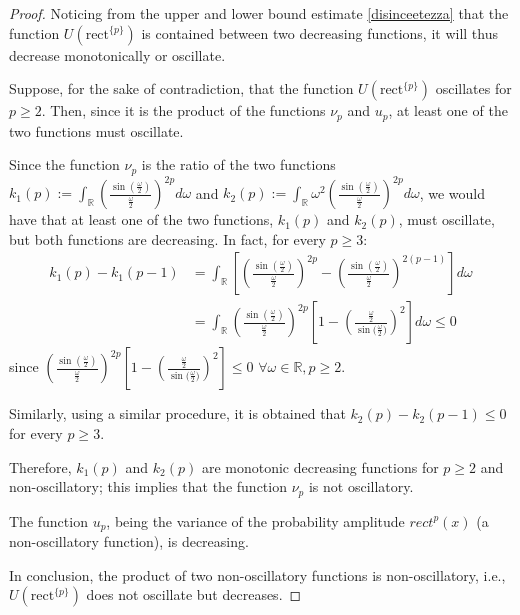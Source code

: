 \documentclass[preprint,hidelinks,authoryear]{elsarticle}
\theoremstyle{plain}
\theoremstyle{definition}
\theoremstyle{remark}
\begin{document}
\begin{proof}
    Noticing from the upper and lower bound estimate \eqref{disinceetezza} that the function $U(\text{rect}^{\{p\}})$ is contained between two decreasing functions, it will thus decrease monotonically or oscillate.

Suppose, for the sake of contradiction, that the function $U(\text{rect}^{\{p\}})$ oscillates for $p \ge 2$. Then, since it is the product of the functions $\nu_p$ and $u_p$, at least one of the two functions must oscillate.

Since the function $\nu_p$ is the ratio of the two functions $k_1(p):=\displaystyle\int_{\mathbb{R}}\left(\displaystyle\frac{\sin(\frac{\omega}{2})}{\frac{\omega}{2}}\right)^{2p}d\omega$ and $k_2(p):=\displaystyle\int_{\mathbb{R}}\omega^2\left(\displaystyle\frac{\sin(\frac{\omega}{2})}{\frac{\omega}{2}}\right)^{2p}d\omega$, we would have that at least one of the two functions, $k_1(p)$ and $k_2(p)$, must oscillate, but both functions are decreasing. In fact, for every $p \ge 3$:
\begin{equation}
\begin{split}
    k_1(p)-k_1(p-1)&=\displaystyle\int_{\mathbb{R}}\left[\left(\displaystyle\frac{\sin(\frac{\omega}{2})}{\frac{\omega}{2}}\right)^{2p}-\left(\displaystyle\frac{\sin(\frac{\omega}{2})}{\frac{\omega}{2}}\right)^{2(p-1)}\right]d\omega\\&=\displaystyle\int_{\mathbb{R}}\left(\displaystyle\frac{\sin(\frac{\omega}{2})}{\frac{\omega}{2}}\right)^{2p}\left[1-\left(\displaystyle\frac{\frac{\omega}{2}}{\sin{(\frac{\omega}{2}})}\right)^2\right]d\omega \le 0
    \end{split}
\end{equation}
since $\left(\displaystyle\frac{\sin(\frac{\omega}{2})}{\frac{\omega}{2}}\right)^{2p}\left[1-\left(\displaystyle\frac{\frac{\omega}{2}}{\sin{(\frac{\omega}{2}})}\right)^2\right] \le 0$  $\forall \omega \in \mathbb{R}, p \ge 2$.

Similarly, using a similar procedure, it is obtained that $k_2(p) - k_2(p-1) \le 0$ for every $p \ge 3$.

Therefore, $k_1(p)$ and $k_2(p)$ are monotonic decreasing functions for $p \ge 2$ and non-oscillatory; this implies that the function $\nu_p$ is not oscillatory.

The function $u_p$, being the variance of the probability amplitude $rect^{{p}}(x)$ (a non-oscillatory function), is decreasing.

In conclusion, the product of two non-oscillatory functions is non-oscillatory, i.e., $U(\text{rect}^{\{p\}})$ does not oscillate but decreases.
\end{proof}
\end{document}
